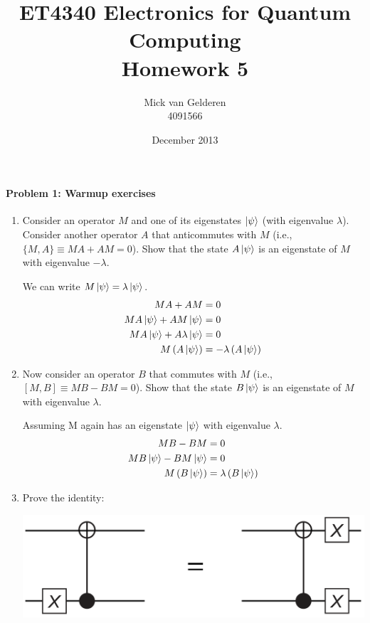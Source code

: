 \documentclass[12pt]{article}
\title{ET4340 Electronics for Quantum Computing\\Homework 5}
\author{
    Mick van Gelderen\\4091566
}
\date{December 2013}
\newenvironment{answer}{\begingroup\setlength{\leftskip}{-\leftmargin}\begin{framed}}{\end{framed}\endgroup}
\begin{document}
\maketitle

\paragraph{Problem 1: Warmup exercises} \hfill

\begin{enumerate}
    \item Consider an operator $M$ and one of its eigenstates $\ket{\psi}$ (with eigenvalue $\lambda$). Consider another operator $A$ that anticommutes with $M$ (i.e., $\{M,A\} \equiv MA + AM = 0$). Show that the state $A\ket{\psi}$ is an eigenstate of $M$ with eigenvalue $-\lambda$.

    \begin{answer}
        We can write $M\ket{\psi} = \lambda\ket{\psi}$.
        \begin{align*}
            MA + AM &= 0 \\
            MA\ket{\psi} + AM\ket{\psi} &= 0 \\
            MA\ket{\psi} + A\lambda\ket{\psi} &= 0 \\
            M\left(A\ket{\psi}\right) &= -\lambda\left(A\ket{\psi}\right) \\
        \end{align*}
    \end{answer}

    \item Now consider an operator $B$ that commutes with $M$ (i.e., $[M,B] \equiv MB - BM = 0$). Show that the state $B\ket{\psi}$ is an eigenstate of $M$ with eigenvalue $\lambda$.

    \begin{answer}
        Assuming M again has an eigenstate $\ket{\psi}$ with eigenvalue $\lambda$.
        \begin{align*}
            MB - BM &= 0 \\
            MB\ket{\psi} - BM\ket{\psi} &= 0 \\
            M\left(B\ket{\psi}\right) &= \lambda\left(B\ket{\psi}\right) \\
        \end{align*}
    \end{answer}

    \item Prove the identity:

    \begin{center}\includegraphics[width=.8\textwidth]{problem-1.png}\end{center}


\end{enumerate}
\end{document}
